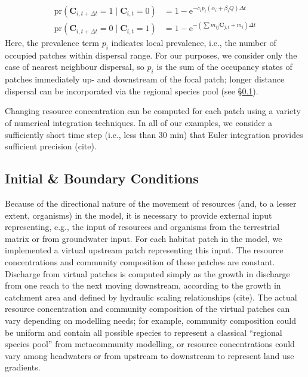 \documentclass[11pt,a4paper]{article}
\begin{document}
\begin{equation}
\begin{split}
	\mathrm{pr}\left( \mathbf{C}_{i, t+\Delta t} = 1 \mid \mathbf{C}_{i, t} = 0\right) &= 
			1 - \mathrm{e}^{-c_i p_i(\alpha_i + \beta_iQ) \Delta t} \\
	\mathrm{pr}\left( \mathbf{C}_{i, t+\Delta t} = 0 \mid \mathbf{C}_{i, t} = 1\right) &= 
			1 - \mathrm{e}^{-\left( \sum{m_{ij}\mathbf{C}_{j, t}} + m_i \right)\Delta t}
	\label{eq:ceprob}
\end{split}
\end{equation}
Here, the prevalence term $p_i$ indicates local prevalence, i.e., the number of occupied patches within dispersal range.
For our purposes, we consider only the case of nearest neighbour dispersal, so $p_i$ is the sum of the occupancy states of patches immediately up- and downstream of the focal patch; longer distance dispersal can be incorporated via the regional species pool (see §\ref{ss:initial-boundary}).

Changing resource concentration can be computed for each patch using a variety of numerical integration techniques.
In all of our examples, we consider a sufficiently short time step (i.e., less than 30 min) that Euler integration provides sufficient precision (cite).

\subsection{Initial \& Boundary Conditions} \label{ss:initial-boundary}

Because of the directional nature of the movement of resources (and, to a lesser extent, organisms) in the model, it is necessary to provide external input representing, e.g., the input of resources and organisms from the terrestrial matrix or from groundwater input.
For each habitat patch in the model, we implemented a virtual upstream patch representing this input.
The resource concentrations and community composition of these patches are constant.
Discharge from virtual patches is computed simply as the growth in discharge from one reach to the next moving downstream, according to the growth in catchment area and defined by hydraulic scaling relationships (cite).
The actual resource concentration and community composition of the virtual patches can vary depending on modelling needs; for example, community composition could be uniform and contain all possible species to represent a classical “regional species pool” from metacommunity modelling, or resource concentrations could vary among headwaters or from upstream to downstream to represent land use gradients.
\end{document}
